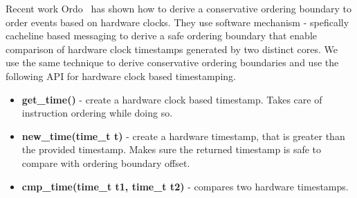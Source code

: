 Recent work Ordo~\cite{ordo} has shown how to derive a conservative ordering boundary to order events based on hardware clocks.
They use software mechanism - spefically cacheline based messaging to derive a safe ordering boundary that enable comparison
of hardware clock timestamps generated by two distinct cores. We use the same technique to derive conservative ordering boundaries and
use the following API for hardware clock based timestamping.


\begin{itemize}
	\item {\bf get\_time()} - create a hardware clock based timestamp. Takes care of instruction ordering while doing so.
	\item {\bf new\_time(time\_t t)} - create a hardware timestamp, that is greater than the provided timestamp. Makes sure the returned 
		timestamp is safe to compare with ordering boundary offset.
	\item {\bf cmp\_time(time\_t t1, time\_t t2)} - compares two hardware timestamps. 
\end{itemize}



